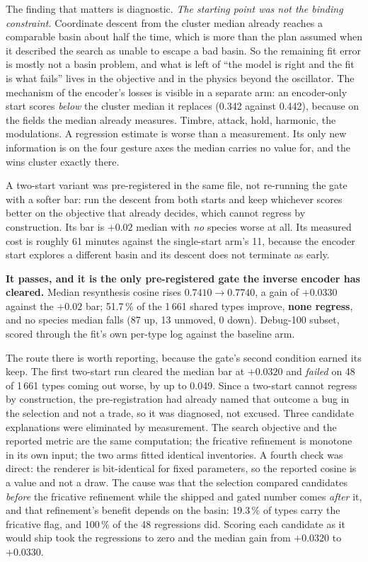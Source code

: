 \documentclass[10pt,twocolumn,a4paper]{article}
\begin{document}
The finding that matters is diagnostic. \emph{The starting point was not the binding
constraint.} Coordinate descent from the cluster median already reaches a comparable basin
about half the time, which is more than the plan assumed when it described the search as
unable to escape a bad basin. So the remaining fit error is mostly not a basin problem, and
what is left of ``the model is right and the fit is what fails'' lives in the objective and
in the physics beyond the oscillator. The mechanism of the encoder's losses is visible in a
separate arm: an encoder-only start scores \emph{below} the cluster median it replaces (0.342
against 0.442), because on the fields the median already measures. Timbre, attack, hold,
harmonic, the modulations. A regression estimate is worse than a measurement. Its only
new information is on the four gesture axes the median carries no value for, and the wins
cluster exactly there.

A two-start variant was pre-registered in the same file, not re-running the gate with
a softer bar: run the descent from both starts and keep whichever scores better on the
objective that already decides, which cannot regress by construction. Its bar is $+0.02$
median with \emph{no} species worse at all. Its measured cost is roughly 61 minutes against
the single-start arm's 11, because the encoder start explores a different basin and its
descent does not terminate as early.

\textbf{It passes, and it is the only pre-registered gate the inverse encoder has cleared.}
Median resynthesis cosine rises $0.7410 \rightarrow 0.7740$, a gain of $+0.0330$ against the
$+0.02$ bar; 51.7\,\% of the 1\,661 shared types improve, \textbf{none regress}, and no
species median falls (87 up, 13 unmoved, 0 down). Debug-100 subset, scored through the fit's
own per-type log against the baseline arm.

The route there is worth reporting, because the gate's second condition earned its keep. The
first two-start run cleared the median bar at $+0.0320$ and \emph{failed} on 48 of 1\,661
types coming out worse, by up to 0.049. Since a two-start cannot regress by construction, the
pre-registration had already named that outcome a bug in the selection and not a trade,
so it was diagnosed, not excused. Three candidate explanations were eliminated by
measurement. The search objective and the reported metric are the same computation; the
fricative refinement is monotone in its own input; the two arms fitted identical inventories. A fourth check was direct: the renderer is bit-identical for fixed parameters, so the
reported cosine is a value and not a draw. The cause was that the selection compared
candidates \emph{before} the fricative refinement while the shipped and gated number comes
\emph{after} it, and that refinement's benefit depends on the basin: 19.3\,\% of types carry
the fricative flag, and 100\,\% of the 48 regressions did. Scoring each candidate as it would
ship took the regressions to zero and the median gain from $+0.0320$ to $+0.0330$.
\end{document}
